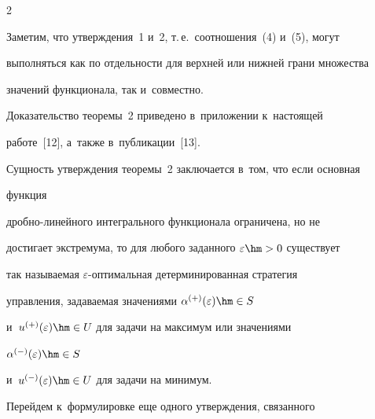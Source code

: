 \begin{multicols}{2}

     

     Заметим, что утверж\-де\-ния~1 и~2, т.\,е.\ соотношения~(4) и~(5), могут 

выполняться как по отдельности для верхней или нижней грани множества 

значений функционала, так и~со\-вместно.

     

     \smallskip

     

     Доказательство теоремы~2 приведено в~приложении к~на\-сто\-ящей 

работе~[12], а~так\-же в~пуб\-ли\-ка\-ции~[13].

     

     \smallskip

     

     Сущность утверж\-де\-ния тео\-ре\-мы~2 заключается в~том, что если основная 

функция  

дроб\-но-ли\-ней\-но\-го интегрального функционала ограничена, но не 

достигает экстремума, то для любого заданного $\varepsilon\hm>0$ существует 

так называемая $\varepsilon$-оп\-ти\-маль\-ная детерминированная стратегия 

управления, за\-да\-ва\-емая значениями $\alpha^{(+)} (\varepsilon)\hm\in S$ 

и~$u^{(+)}(\varepsilon)\hm\in U$ для задачи на максимум или значениями 

$\alpha^{(-)} (\varepsilon)\hm\in S$  

и~$u^{(-)}(\varepsilon)\hm\in U$ для задачи на минимум.

     

     Перейдем к~формулировке еще одного утверж\-де\-ния, связанного 


\end{multicols}
